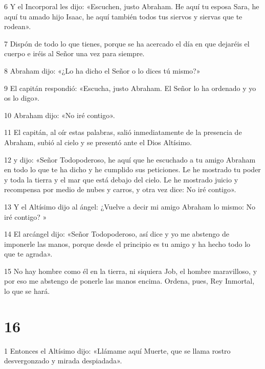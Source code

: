 \par 6 Y el Incorporal les dijo: «Escuchen, justo Abraham. He aquí tu esposa Sara, he aquí tu amado hijo Isaac, he aquí también todos tus siervos y siervas que te rodean».

\par 7 Dispón de todo lo que tienes, porque se ha acercado el día en que dejaréis el cuerpo e iréis al Señor una vez para siempre.

\par 8 Abraham dijo: «¿Lo ha dicho el Señor o lo dices tú mismo?»

\par 9 El capitán respondió: «Escucha, justo Abraham. El Señor lo ha ordenado y yo os lo digo».

\par 10 Abraham dijo: «No iré contigo».

\par 11 El capitán, al oír estas palabras, salió inmediatamente de la presencia de Abraham, subió al cielo y se presentó ante el Dios Altísimo.

\par 12 y dijo: «Señor Todopoderoso, he aquí que he escuchado a tu amigo Abraham en todo lo que te ha dicho y he cumplido sus peticiones. Le he mostrado tu poder y toda la tierra y el mar que está debajo del cielo. Le he mostrado juicio y recompensa por medio de nubes y carros, y otra vez dice: No iré contigo».

\par 13 Y el Altísimo dijo al ángel: ¿Vuelve a decir mi amigo Abraham lo mismo: No iré contigo? »

\par 14 El arcángel dijo: «Señor Todopoderoso, así dice y yo me abstengo de imponerle las manos, porque desde el principio es tu amigo y ha hecho todo lo que te agrada».

\par 15 No hay hombre como él en la tierra, ni siquiera Job, el hombre maravilloso, y por eso me abstengo de ponerle las manos encima. Ordena, pues, Rey Inmortal, lo que se hará.

\chapter{16}

\par 1 Entonces el Altísimo dijo: «Llámame aquí Muerte, que se llama rostro desvergonzado y mirada despiadada».

